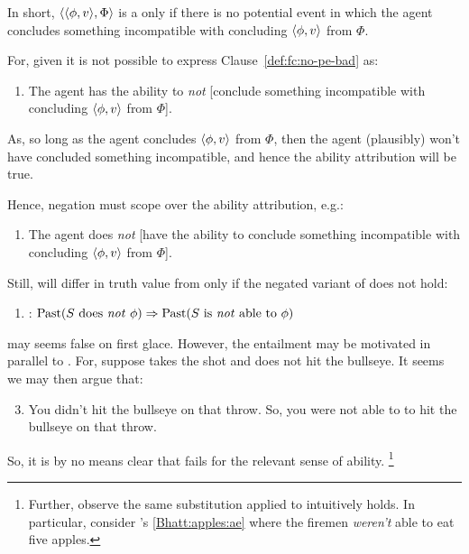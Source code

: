 \begin{note}
  In short, \(\langle \langle \phi, v \rangle, \Phi \rangle\) is a \fc{} only if there is no potential event in which the agent concludes something incompatible with concluding \(\langle \phi, v \rangle\) from \(\Phi\).

  For, given \BoyPS{} it is not possible to express Clause~\ref{def:fc:no-pe-bad} as:
  \begin{enumerate}[label=\emph{n}., ref=(\emph{n})]
  \item
    \label{Ability:past:narrow}
    The agent has the ability to \emph{not} [conclude something incompatible with concluding \(\langle \phi, v \rangle\) from \(\Phi\)].
  \end{enumerate}
  As, so long as the agent concludes \(\langle \phi, v \rangle\) from \(\Phi\), then the agent (plausibly) won't have concluded something incompatible, and hence the ability attribution will be true.

  Hence, negation must scope over the ability attribution, e.g.:

  \begin{enumerate}[label=\emph{w}., ref=(\emph{w})]
  \item
    \label{Ability:past:wide}
    The agent does \emph{not} [have the ability to conclude something incompatible with concluding \(\langle \phi, v \rangle\) from \(\Phi\)].
  \end{enumerate}

  Still, \label{Ability:past:wide} will differ in truth value from \label{Ability:past:narrow} only if the negated variant of \BoyPS{} does not hold:
  \begin{enumerate}[label=]
  \item
    \label{Boylan:Past-Success:CQC}
    \BoyPSCQC{}: \(\text{Past}(S\text{ does \emph{not} }\phi) \Rightarrow \text{Past}(S\text{ is \emph{not} able to }\phi)\)
  \end{enumerate}
  \BoyPSCQC{} may seems false on first glace.
  However, the entailment may be motivated in parallel to \BoyPS{}.
  For, suppose \citeauthor{Boylan:2020aa} takes the shot and does not hit the bullseye.
  It seems we may then argue that:

  \begin{enumerate}[label=\arabic*\('\).]
    \setcounter{enumi}{2}
  \item
    You didn't hit the bullseye on that throw.\newline
    So, you were not able to to hit the bullseye on that throw.
  \end{enumerate}
  So, it is by no means clear that \BoyPSCQC{} fails for the relevant sense of ability.%
  \footnote{
    Further, observe the same substitution applied to \BoyPSC{} intuitively holds.
    In particular, consider \citeauthor{Bhatt:2008aa}'s \ref{Bhatt:apples:ae} where the firemen \emph{weren't} able to eat five apples.
  }
\end{note}

